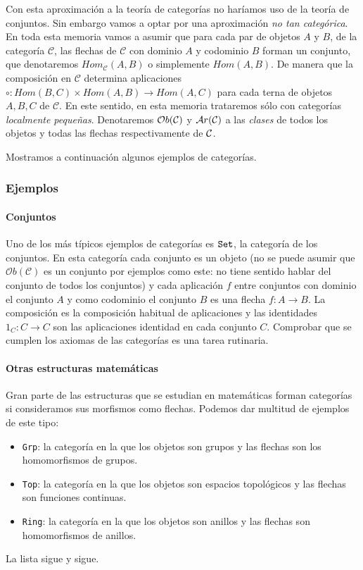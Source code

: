 Con esta aproximación a la teoría de categorías no haríamos uso de la teoría de conjuntos. Sin embargo vamos a optar por una aproximación \emph{no tan categórica}. En toda esta memoria vamos a asumir que para cada par de objetos $A$ y $B$, de la categoría $\mathcal{C}$, las flechas de $\mathcal{C}$ con dominio $A$ y codominio $B$ forman un conjunto, que denotaremos $Hom_{\mathcal{C}}(A,B)$ o simplemente $Hom(A,B)$. De manera que la composición en $\mathcal{C}$ determina aplicaciones $\circ : Hom(B, C)\times Hom(A, B) \rightarrow Hom(A, C)$ para cada terna de objetos $A,B,C$ de $\mathcal{C}$. En este sentido, en esta memoria trataremos sólo con categorías \emph{localmente pequeñas}. Denotaremos $\mathcal{O}b(\mathcal{C})$ y $\mathcal{A}r(\mathcal{C})$ a las \emph{clases} de todos los objetos y todas las flechas respectivamente de $\mathcal{C}$.




Mostramos a continuación algunos ejemplos de categorías.

\subsubsection{Ejemplos}
\paragraph{Conjuntos}
Uno de los más típicos ejemplos de categorías es $\texttt{Set}$,
la categoría de los conjuntos. En esta categoría
cada conjunto es un objeto (no se puede asumir que
$\mathcal{O}b(\mathcal{C})$ es un conjunto por ejemplos como este:
no tiene sentido hablar del conjunto de todos los conjuntos) y cada
aplicación $f$ entre conjuntos con dominio el conjunto $A$ y como codominio
el conjunto $B$ es una flecha $f : A \longrightarrow B$. La composición
es la composición habitual de aplicaciones y las identidades
$1_C : C \longrightarrow C$ son las aplicaciones identidad en
cada conjunto $C$.
Comprobar que se cumplen los axiomas de las categorías es una tarea
rutinaria.

\paragraph{Otras estructuras matemáticas}
Gran parte de las estructuras que se estudian en matemáticas forman
categorías si consideramos sus morfismos como flechas.
Podemos dar multitud de ejemplos de este tipo:

\begin{itemize}
\item \texttt{Grp}: la categoría en la que los objetos son grupos
  y las flechas son los homomorfismos de grupos.
\item \texttt{Top}: la categoría en la que los objetos son espacios
  topológicos y las flechas son funciones continuas.
\item \texttt{Ring}: la categoría en la que los objetos son
  anillos y las flechas son homomorfismos de anillos.
\end{itemize}
La lista sigue y sigue.

